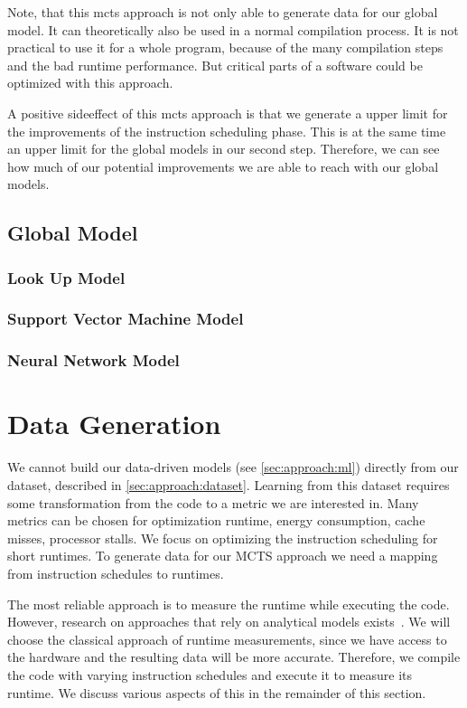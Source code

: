 Note, that this \ac{mcts} approach is not only able to generate data for our global model.
It can theoretically also be used in a normal compilation process.
It is not practical to use it for a whole program, because of the many compilation steps and the bad runtime performance.
But critical parts of a software could be optimized with this approach.

A positive sideeffect of this \ac{mcts} approach is that we generate a upper limit for the improvements of the instruction scheduling phase.
This is at the same time an upper limit for the global models in our second step.
Therefore, we can see how much of our potential improvements we are able to reach with our global models.

\subsection{Global Model}
\label{subsec:approach:ml:global}
\subsubsection{Look Up Model}
\subsubsection{Support Vector Machine Model}
\subsubsection{Neural Network Model}

\section{Data Generation}
\tobechecked
We cannot build our data-driven models (see \cref{sec:approach:ml}) directly from our dataset, described in \cref{sec:approach:dataset}.
Learning from this dataset requires some transformation from the code to a metric we are interested in.
Many metrics can be chosen for optimization \eg runtime, energy consumption, cache misses, processor stalls.
We focus on optimizing the instruction scheduling for short runtimes.
To generate data for our MCTS approach we need a mapping from instruction schedules to runtimes.

The most reliable approach is to measure the runtime while executing the code.
However, research on approaches that rely on analytical models exists~\cite{llvm:mca, mendis2019ithemal, taha2003instruction, laukemann2018automated}.
We will choose the classical approach of runtime measurements, since we have access to the hardware and the resulting data will be more accurate.
Therefore, we compile the code with varying instruction schedules and execute it to measure its runtime.
We discuss various aspects of this in the remainder of this section.

